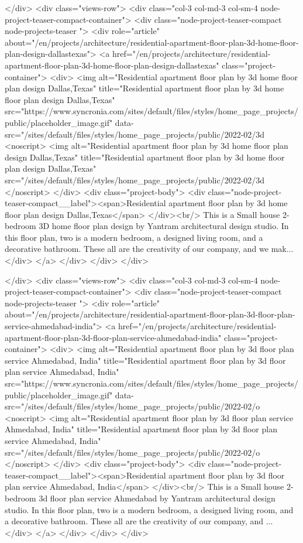   </div>
    <div class="views-row">
    <div class="col-3 col-md-3 col-sm-4 node-project-teaser-compact-container">
	<div class="node-project-teaser-compact node-projects-teaser ">
		<div  role="article" about="/en/projects/architecture/residential-apartment-floor-plan-3d-home-floor-plan-design-dallastexas">
			<a href="/en/projects/architecture/residential-apartment-floor-plan-3d-home-floor-plan-design-dallastexas" class="project-container">
				<div>
					<img alt="Residential apartment floor plan by 3d home floor plan design Dallas,Texas" title="Residential apartment floor plan by 3d home floor plan design Dallas,Texas" src="https://www.syncronia.com/sites/default/files/styles/home_page_projects/public/placeholder_image.gif" data-src="/sites/default/files/styles/home_page_projects/public/2022-02/3d%
					<noscript>
						<img alt="Residential apartment floor plan by 3d home floor plan design Dallas,Texas" title="Residential apartment floor plan by 3d home floor plan design Dallas,Texas" src="/sites/default/files/styles/home_page_projects/public/2022-02/3d%
					</noscript>
				</div>
				<div class="project-body">
				<div class="node-project-teaser-compact__label"><span>Residential apartment floor plan by 3d home floor plan design Dallas,Texas</span>
</div><br/>
				This is a Small house 2- bedroom 3D home floor plan design by Yantram architectural design studio. In this floor plan, two is a modern bedroom, a designed living room, and a decorative bathroom. These all are the creativity of our company, and we mak...
				</div>
			</a>
		</div>
	</div>
</div>


  </div>
    <div class="views-row">
    <div class="col-3 col-md-3 col-sm-4 node-project-teaser-compact-container">
	<div class="node-project-teaser-compact node-projects-teaser ">
		<div  role="article" about="/en/projects/architecture/residential-apartment-floor-plan-3d-floor-plan-service-ahmedabad-india">
			<a href="/en/projects/architecture/residential-apartment-floor-plan-3d-floor-plan-service-ahmedabad-india" class="project-container">
				<div>
					<img alt="Residential apartment floor plan by 3d floor plan service Ahmedabad, India" title="Residential apartment floor plan by 3d floor plan service Ahmedabad, India" src="https://www.syncronia.com/sites/default/files/styles/home_page_projects/public/placeholder_image.gif" data-src="/sites/default/files/styles/home_page_projects/public/2022-02/o%
					<noscript>
						<img alt="Residential apartment floor plan by 3d floor plan service Ahmedabad, India" title="Residential apartment floor plan by 3d floor plan service Ahmedabad, India" src="/sites/default/files/styles/home_page_projects/public/2022-02/o%
					</noscript>
				</div>
				<div class="project-body">
				<div class="node-project-teaser-compact__label"><span>Residential apartment floor plan by 3d floor plan service Ahmedabad, India</span>
</div><br/>
				This is a Small house 2- bedroom 3d floor plan service Ahmedabad by Yantram architectural design studio. In this floor plan, two is a modern bedroom, a designed living room, and a decorative bathroom. These all are the creativity of our company, and ...
				</div>
			</a>
		</div>
	</div>
</div>


